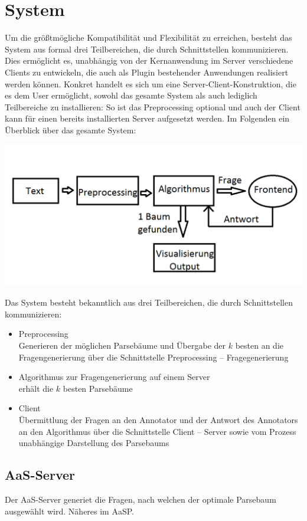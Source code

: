 \documentclass{scrartcl}
\begin{document}
\section{System}
\label{sec:System}
Um die größtmögliche Kompatibilität und Flexibilität zu erreichen, besteht das System aus formal drei Teilbereichen, die durch Schnittstellen kommunizieren.
Dies ermöglicht es, unabhängig von der Kernanwendung im Server verschiedene Clients zu entwickeln, die auch als Plugin bestehender Anwendungen realisiert werden können.
Konkret handelt es sich um eine Server-Client-Konstruktion, die es dem User ermöglicht, sowohl das gesamte System als auch lediglich Teilbereiche zu installieren: So ist das Preprocessing optional und auch der Client kann für einen bereits installierten Server aufgesetzt werden.
Im Folgenden ein Überblick über das gesamte System:
\begin{center}
    \includegraphics[scale=0.4]{Grafik}
\end{center}
Das System besteht bekanntlich aus drei Teilbereichen, die durch Schnittstellen kommunizieren:
\begin{itemize}
\item Preprocessing\\Generieren der möglichen Parsebäume und Übergabe der $k$ besten an die Fragengenerierung über die Schnittstelle Preprocessing – Fragegenerierung
\item Algorithmus zur Fragengenerierung auf einem Server\\erhält die $k$ besten Parsebäume 
\item Client\\Übermittlung der
Fragen an den Annotator und der Antwort des Annotators an den Algorithmus über die Schnittstelle Client – Server sowie vom Prozess unabhängige Darstellung des Parsebaums 
\end{itemize}

\subsection{AaS-Server}
\label{sub:AaS-Server}
Der AaS-Server generiet die Fragen, nach welchen der optimale Parsebaum ausgewählt wird. 
Näheres im AaSP.
\end{document}
